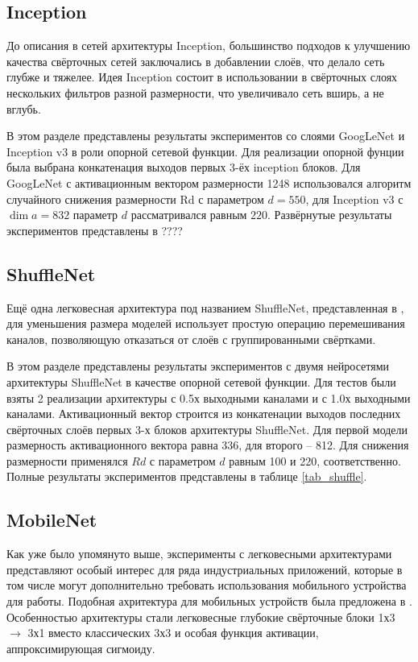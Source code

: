 \documentclass{article}
\begin{document}
\begin{large}
\subsection{Inception}

До описания в \cite{googlenet} сетей архитектуры Inception, большинство подходов к улучшению качества свёрточных сетей заключались в добавлении слоёв, что делало сеть глубже и тяжелее. Идея Inception состоит в использовании в свёрточных слоях нескольких фильтров разной размерности, что увеличивало сеть вширь, а не вглубь.

В этом разделе представлены результаты экспериментов со слоями GoogLeNet \cite{googlenet} и Inception v3 \cite{inception} в роли опорной сетевой функции. Для реализации опорной фунции была выбрана конкатенация выходов первых 3-ёх inception блоков. Для GoogLeNet с активационным вектором размерности 1248 использовался алгоритм случайного снижения размерности Rd с параметром $d = 550$, для Inception v3 с $\dim a = 832$ параметр $d$ рассматривался равным $220$. Развёрнутые результаты экспериментов представлены в ????

\subsection{ShuffleNet}

Ещё одна легковесная архитектура под названием ShuffleNet, представленная в \cite{shuffle}, для уменьшения размера моделей использует простую операцию перемешивания каналов, позволяющую отказаться от слоёв с группированными свёртками.

В этом разделе представлены результаты экспериментов с двумя нейросетями архитектуры ShuffleNet в качестве опорной сетевой функции. Для тестов были взяты 2 реализации архитектуры с 0.5х выходными каналами и с 1.0х выходными каналами. Активационный вектор строится из конкатенации выходов последних свёрточных слоёв первых 3-х блоков архитектуры ShuffleNet. Для первой модели размерность активационного вектора равна 336, для второго -- 812. Для снижения размерности применялся $Rd$ с параметром $d$ равным 100 и 220, соответственно. Полные результаты экспериментов представлены в таблице \ref{tab_shuffle}.

\subsection{MobileNet}

Как уже было упомянуто выше, эксперименты с легковесными архитектурами представляют особый интерес для ряда индустриальных приложений, которые в том числе могут дополнительно требовать использования мобильного устройства для работы. Подобная ахритектура для мобильных устройств была предложена в \cite{mobilenet}. Особенностью архитектуры стали легковесные глубокие свёрточные блоки 1х3 $\rightarrow$ 3х1 вместо классических 3х3 и особая функция активации, аппроксимирующая сигмоиду.


\end{large}
\end{document}
